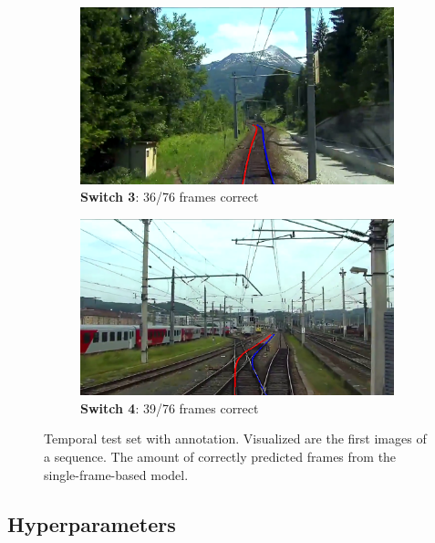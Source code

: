 \begin{figure}[H]
    \begin{subfigure}[b]{0.48\textwidth}
        \centering
        \includegraphics[width=\textwidth]{PICs/experiments/temporalModels/partlyRichtig.png}
        \caption{\textbf{Switch 3}: 36/76 frames correct}
    \end{subfigure}
    \hfill
    \begin{subfigure}[b]{0.48\textwidth}
        \centering
        \includegraphics[width=\textwidth]{PICs/experiments/temporalModels/partlyRichtig2.png}
        \caption{\textbf{Switch 4}: 39/76 frames correct}
    \end{subfigure}
    \caption{Temporal test set with annotation. Visualized are the first images of a sequence. The amount of correctly predicted frames from the single-frame-based model.}
    \label{fig:temporalTestSet}
\end{figure}

\subsection{Hyperparameters}

